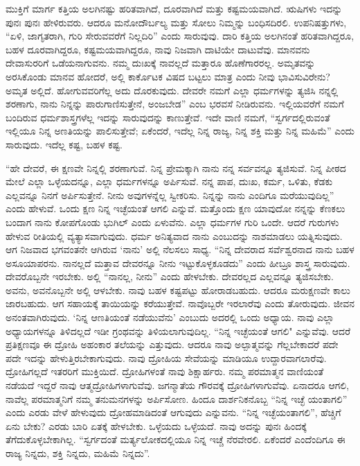 ಮುಕ್ತಿಗೆ ಮಾರ್ಗ ಕತ್ತಿಯ ಅಲಗಿನಷ್ಟು ಹರಿತವಾಗಿದೆ, ದೂರವಾಗಿದೆ ಮತ್ತು ಕಷ್ಟಮಯವಾಗಿದೆ. ಋಷಿಗಳು ಇದನ್ನು ಪುನಃ ಪುನಃ ಹೇಳಿರುವರು. ಆದರೂ ಮನೋದೌರ್ಬಲ್ಯ ಮತ್ತು ಸೋಲು ನಿಮ್ಮನ್ನು ಬಂಧಿಸದಿರಲಿ. ಉಪನಿಷತ್ತುಗಳು, “ಏಳಿ, ಜಾಗೃತರಾಗಿ, ಗುರಿ ಸೇರುವವರೆಗೆ ನಿಲ್ಲದಿರಿ'' ಎಂದು ಸಾರುವುವು. ದಾರಿ ಕತ್ತಿಯ ಅಲಗಿನಂತೆ ಹರಿತವಾಗಿದ್ದರೂ, ಬಹಳ ದೂರವಾಗಿದ್ದರೂ, ಕಷ್ಟಮಯವಾಗಿದ್ದರೂ, ನಾವು ನಿಜವಾಗಿ ದಾಟಿಯೇ ದಾಟುವೆವು. ಮಾನವನು ದೇವಾಸುರರಿಗೆ ಒಡೆಯನಾಗುವನು. ನಮ್ಮ ದುಃಖಕ್ಕೆ ನಾವಲ್ಲದೆ ಮತ್ತಾರೂ ಹೊಣೆಗಾರರಲ್ಲ. ಅಮೃತವನ್ನು ಅರಸಿಕೊಂಡು ಮಾನವ ಹೋದರೆ, ಅಲ್ಲಿ ಕಾರ್ಕೊಟಕ ವಿಷದ ಬಟ್ಟಲು ಮಾತ್ರ ಎಂದು ನೀವು ಭಾವಿಸುವಿರೇನು? ಅಮೃತ ಅಲ್ಲಿದೆ. ಹೋಗುವವರಿಗೆಲ್ಲ ಅದು ದೊರಕುವುದು. ದೇವರೇ ನಮಗೆ ಎಲ್ಲಾ ಧರ್ಮಗಳನ್ನು ತ್ಯಜಿಸಿ ನನ್ನಲ್ಲಿ ಶರಣಾಗು, ನಾನು ನಿನ್ನನ್ನು ಪಾರುಗಾಣಿಸುತ್ತೇನೆ, ಅಂಜಬೇಡ'' ಎಂಬ ಭರವಸೆ ನೀಡಿರುವನು. ಇಲ್ಲಿಯವರೆಗೆ ನಮಗೆ ಬಂದಿರುವ ಧರ್ಮಶಾಸ್ತ್ರಗಳೆಲ್ಲ ಇದನ್ನು ಸಾರುವುದನ್ನು ಕಾಣುತ್ತೇವೆ. ಇದೇ ವಾಣಿ ನಮಗೆ, “ಸ್ವರ್ಗದಲ್ಲಿರುವಂತೆ ಇಲ್ಲಿಯೂ ನಿನ್ನ ಅಣತಿಯನ್ನು ಪಾಲಿಸುತ್ತೇವೆ; ಏಕೆಂದರೆ, ಇದೆಲ್ಲ ನಿನ್ನ ರಾಜ್ಯ, ನಿನ್ನ ಶಕ್ತಿ ಮತ್ತು ನಿನ್ನ ಮಹಿಮೆ'' ಎಂದು ಸಾರುವುದು. ಇದೆಲ್ಲ ಕಷ್ಟ, ಬಹಳ ಕಷ್ಟ.

“ಹೇ ದೇವರೆ, ಈ ಕ್ಷಣವೇ ನಿನ್ನಲ್ಲಿ ಶರಣಾಗುವೆ. ನಿನ್ನ ಪ್ರೇಮಕ್ಕಾಗಿ ನಾನು ನನ್ನ ಸರ್ವವನ್ನೂ ತ್ಯಜಿಸುವೆ. ನಿನ್ನ ಪೀಠದ ಮೇಲೆ ಎಲ್ಲಾ ಒಳ್ಳೆಯದನ್ನೂ, ಎಲ್ಲಾ ಧರ್ಮಗಳನ್ನೂ ಅರ್ಪಿಸುವೆ. ನನ್ನ ಪಾಪ, ದುಃಖ, ಕರ್ಮ, ಒಳಿತು, ಕೆಡಕು ಎಲ್ಲವನ್ನೂ ನಿನಗೆ ಅರ್ಪಿಸುತ್ತೇನೆ. ನೀನು ಅವುಗಳನ್ನೆಲ್ಲ ಸ್ವೀಕರಿಸು. ನಿನ್ನನ್ನು ನಾನು ಎಂದಿಗೂ ಮರೆಯುವುದಿಲ್ಲ” ಎಂದು ಹೇಳುವೆ. ಒಂದು ಕ್ಷಣ ನಿನ್ನ ಇಚ್ಛೆಯಂತೆ ಆಗಲಿ ಎನ್ನುವೆ. ಮತ್ತೊಂದು ಕ್ಷಣ ಯಾವುದೋ ನನ್ನನ್ನು ಕೆಣಕಲು ಬಂದಾಗ ನಾನು ಕೋಪಗೊಂಡು ಭುಗಿಲ್ ಎಂದು ಏಳುವೆನು. ಎಲ್ಲಾ ಧರ್ಮಗಳ ಗುರಿ ಒಂದೇ. ಆದರೆ ಗುರುಗಳು ಹೇಳುವ ರೀತಿಯಲ್ಲಿ ವ್ಯತ್ಯಾಸವಾಗುವುದು. ಧರ್ಮ ಅನಿತ್ಯವಾದ ನಾನು ಎಂಬುದನ್ನು ನಾಶಮಾಡಲು ಯತ್ನಿಸುವುದು. ಆಗ ನಿಜವಾದ ಭಗವಂತನೇ ಆಗಿರುವ `ನಾನು' ಅಲ್ಲಿ ನೆಲಸಲು ಸಾಧ್ಯ. “ನಿನ್ನ ದೇವರಾದ ಸರ್ವೆಶ್ವರನಾದ ನಾನು ಬಹಳ ಅಸೂಯಾಪರನು. ನಾನಲ್ಲದೆ ಮತ್ತಾವ ದೇವರನ್ನೂ ನೀನು ಇಟ್ಟುಕೊಳ್ಳಕೂಡದು'' ಎಂದು ಹೀಬ್ರೂ ಶಾಸ್ತ್ರ ಸಾರುವುದು. ದೇವರೊಬ್ಬನೇ ಇರಬೇಕು. ಅಲ್ಲಿ “ನಾನಲ್ಲ, ನೀನು'' ಎಂದು ಹೇಳಬೇಕು. ದೇವರಲ್ಲದ ಎಲ್ಲವನ್ನೂ ತ್ಯಜಿಸಬೇಕು. ಅವನು, ಅವನೊಬ್ಬನೇ ಅಲ್ಲಿ ಆಳಬೇಕು. ನಾವು ಬಹಳ ಕಷ್ಟಪಟ್ಟು ಹೋರಾಡಬಹುದು. ಆದರೂ ಮರುಕ್ಷಣವೇ ಕಾಲು ಜಾರಬಹುದು. ಆಗ ಸಹಾಯಕ್ಕೆ ತಾಯಿಯನ್ನು ಕರೆಯುತ್ತೇವೆ. ನಾವೊಬ್ಬರೇ ಇರಲಾರೆವು ಎಂದು ತೋರುವುದು. ಜೀವನ ಅನಂತವಾಗಿರುವುದು. `ನಿನ್ನ ಆಣತಿಯಂತೆ ನಡೆಯುವೆನು' ಎಂಬುದು ಅದರಲ್ಲಿ ಒಂದು ಅಧ್ಯಾಯ. ನಾವು ಎಲ್ಲಾ ಅಧ್ಯಾಯಗಳನ್ನೂ ತಿಳಿದಲ್ಲದೆ ಇಡೀ ಗ್ರಂಥವನ್ನು ತಿಳಿಯಲಾಗುವುದಿಲ್ಲ. “ನಿನ್ನ ಇಚ್ಛೆಯಂತೆ ಆಗಲಿ" ಎನ್ನುವೆವು. ಆದರೆ ಪ್ರತಿಕ್ಷಣವೂ ಈ ದ್ರೋಹಿ ಅಹಂಕಾರ ತಲೆಯನ್ನು ಎತ್ತುವುದು. ಆದರೂ ನಾವು ಅಲ್ಪಾತ್ಮವನ್ನು ಗೆಲ್ಲಬೇಕಾದರೆ ಪದೇ ಪದೇ ಇದನ್ನು ಹೇಳುತ್ತಿರಬೇಕಾಗುವುದು. ನಾವು ದ್ರೋಹಿಯ ಸೇವೆಯನ್ನು ಮಾಡಿಯೂ ಉದ್ದಾರವಾಗಲಾರೆವು. ದ್ರೋಹಿಗಲ್ಲದೆ ಇತರರಿಗೆ ಮುಕ್ತಿಯಿದೆ. ದ್ರೋಹಿಗಳಂತೆ ನಾವು ಶಿಕ್ಷಾರ್ಹರು. ನಮ್ಮ ಪರಮಾತ್ಮನ ವಾಣಿಯಂತೆ ನಡೆಯದೆ ಇದ್ದರೆ ನಾವು ಆತ್ಮದ್ರೋಹಿಗಳಾಗುವೆವು. ಜಗನ್ಮಾತೆಯ ಗೌರವಕ್ಕೆ ದ್ರೋಹಿಗಳಾಗುವೆವು. ಏನಾದರೂ ಆಗಲಿ, ನಾವೆಲ್ಲ ಪರಮಾತ್ಮನಿಗೆ ನಮ್ಮ ತನುಮನಗಳನ್ನು ಅರ್ಪಿಸೋಣ. ಹಿಂದೂ ದಾರ್ಶನಿಕನೊಬ್ಬ “ನಿನ್ನ ಇಚ್ಛೆ ಯಂತಾಗಲಿ'' ಎಂದು ಎರಡು ವೇಳೆ ಹೇಳುವುದು ದ್ರೋಹಮಾಡಿದಂತೆ ಆಗುವುದು ಎನ್ನುವನು. “ನಿನ್ನ ಇಚ್ಛೆಯಂತಾಗಲಿ”, ಹೆಚ್ಚಿಗೆ ಏನು ಬೇಕು? ಎರಡು ಬಾರಿ ಏತಕ್ಕೆ ಹೇಳಬೇಕು. ಒಳ್ಳೆಯದು ಒಳ್ಳೆಯದೆ. ನಾವು ಅದನ್ನು ಪುನಃ ಹಿಂದಕ್ಕೆ ತೆಗೆದುಕೊಳ್ಳಬೇಕಾಗಿಲ್ಲ. “ಸ್ವರ್ಗದಂತೆ ಮರ್ತ್ಯಲೋಕದಲ್ಲಿಯೂ ನಿನ್ನ ಇಚ್ಚೆ ನೆರವೇರಲಿ. ಏಕೆಂದರೆ ಎಂದೆಂದಿಗೂ ಈ ರಾಜ್ಯ ನಿನ್ನದು, ಶಕ್ತಿ ನಿನ್ನದು, ಮಹಿಮೆ ನಿನ್ನದು”.

